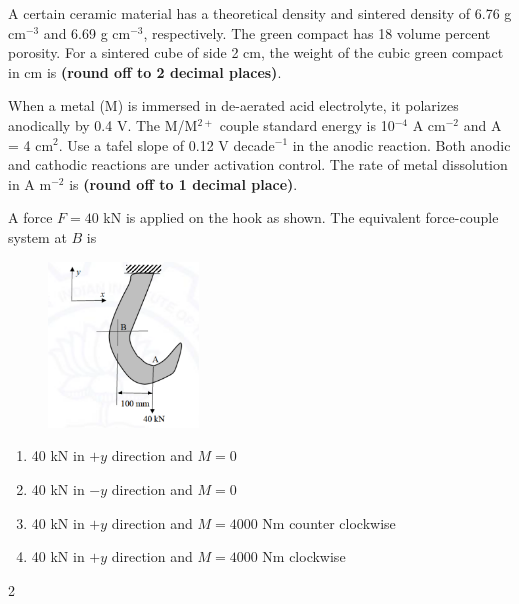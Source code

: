     \item A certain ceramic material has a theoretical density and sintered density of 6.76 g cm$^{-3}$ and 6.69 g cm$^{-3}$, respectively. The green compact has 18 volume percent porosity. For a sintered cube of side 2 cm, the weight of the cubic green compact in cm is \textbf{(round off to 2 decimal places)}.

    \item When a metal (M) is immersed in de-aerated acid electrolyte, it polarizes anodically by 0.4 V. The M/M$^{2+}$ couple standard energy is 10$^{-4}$ A cm$^{-2}$ and A = 4 cm$^2$. Use a tafel slope of 0.12 V decade$^{-1}$ in the anodic reaction. Both anodic and cathodic reactions are under activation control. The rate of metal dissolution in A m$^{-2}$ is \textbf{(round off to 1 decimal place)}.

    \item A force $F = 40$ kN is applied on the hook as shown. The equivalent force-couple system at $B$ is
     \begin{figure}[!ht]
    \centering
    \includegraphics[width=4cm]{./GATE-yearwise/2021/figs/fig1.png}
    \end{figure}
    \begin{enumerate}
        \item 40 kN in $+y$ direction and $M = 0$
        \item 40 kN in $-y$ direction and $M = 0$
        \item 40 kN in $+y$ direction and $M = 4000$ Nm counter clockwise
        \item 40 kN in $+y$ direction and $M = 4000$ Nm clockwise
    \end{enumerate}
2

